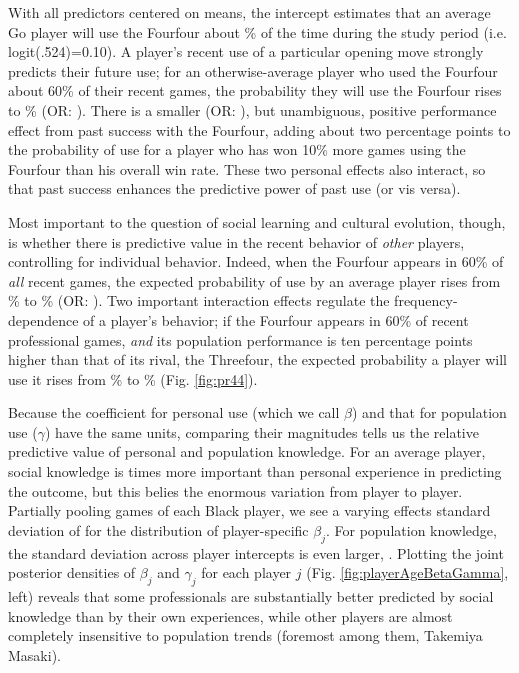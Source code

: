 \documentclass[reqno,12pt]{amsart}
\begin{document}
With all predictors centered on means, the intercept estimates that an average Go player will use the Fourfour about \prIndUseBaseline\% of the time during the study period (i.e. logit(.524)=0.10). A player's recent use of a particular opening move strongly predicts their future use; for an otherwise-average player who used the Fourfour about 60\% of their recent games, the probability they will use the Fourfour rises to \prIndUseSixty\% (OR: \orIndUse). There is a smaller (OR: \orIndUseWin), but unambiguous, positive performance effect from past success with the Fourfour, adding about two percentage points to the probability of use for a player who has won 10\% more games using the Fourfour than his overall win rate. These two personal effects also interact, so that past success enhances the predictive power of past use (or vis versa).

Most important to the question of social learning and cultural evolution, though, is whether there is predictive value in the recent behavior of \textit{other} players, controlling for individual behavior. Indeed, when the Fourfour appears in 60\% of \textit{all} recent games, the expected probability of use by an average player rises from \prIndUseBaseline\% to \prPopUseSixty\% (OR: \orPopUse). Two important interaction effects regulate the frequency-dependence of a player's behavior; if the Fourfour appears in 60\% of recent professional games, \textit{and} its population performance is ten percentage points higher than that of its rival, the Threefour, the expected probability a player will use it rises from \prPopUseSixty\% to \prPopUseSixtyWinTen\% (Fig. \ref{fig:pr44}).

Because the coefficient for personal use (which we call $\beta$) and that for population use ($\gamma$) have the same units, comparing their magnitudes tells us the relative predictive value of personal and population knowledge. For an average player, social knowledge is \socialIndyRatio{} times more important than personal experience in predicting the outcome, but this belies the enormous variation from player to player. Partially pooling games of each Black player, we see a varying effects standard deviation of \playerIndyVaref{} for the distribution of player-specific $\beta_j$. For population knowledge, the standard deviation across player intercepts is even larger, \playerSocialVaref. Plotting the joint posterior densities of $\beta_j$ and $\gamma_j$ for each player $j$ (Fig. \ref{fig:playerAgeBetaGamma}, left) reveals that some professionals are substantially better predicted by social knowledge than by their own experiences, while other players are almost completely insensitive to population trends (foremost among them, Takemiya Masaki).
\end{document}
